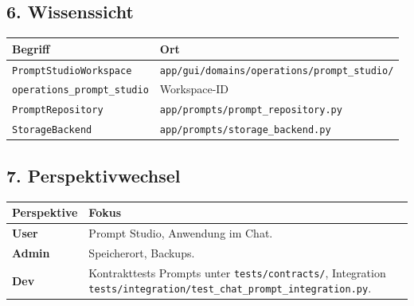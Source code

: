\subsection{6. Wissenssicht}

\begin{center}
\begin{tabular}{ll}
\hline
Begriff & Ort \\
\hline
\texttt{PromptStudioWorkspace} & \texttt{app/gui/domains/operations/prompt\_studio/} \\
\texttt{operations\_prompt\_studio} & Workspace-ID \\
\texttt{PromptRepository} & \texttt{app/prompts/prompt\_repository.py} \\
\texttt{StorageBackend} & \texttt{app/prompts/storage\_backend.py} \\
\hline
\end{tabular}
\end{center}

\subsection{7. Perspektivwechsel}

\begin{center}
\begin{tabular}{ll}
\hline
Perspektive & Fokus \\
\hline
\textbf{User} & Prompt Studio, Anwendung im Chat. \\
\textbf{Admin} & Speicherort, Backups. \\
\textbf{Dev} & Kontrakttests Prompts unter \texttt{tests/contracts/}, Integration \texttt{tests/integration/test\_chat\_prompt\_integration.py}. \\
\hline
\end{tabular}
\end{center}
